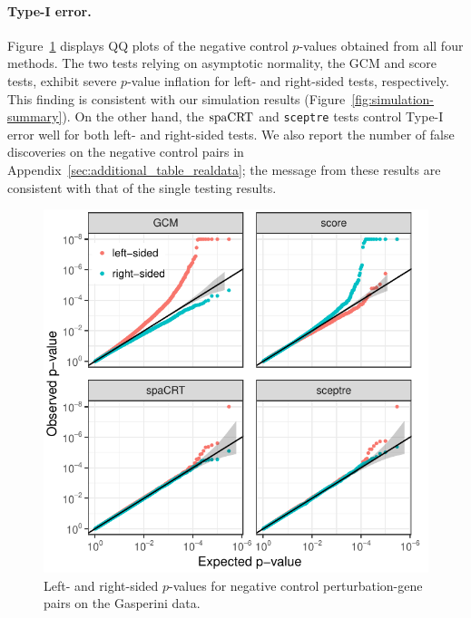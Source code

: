 \documentclass[12pt]{article}
\theoremstyle{definition}
\newcommand{\spacrt}{\textnormal{spaCRT}}               %
\begin{document}
\paragraph{Type-I error.} Figure~\ref{fig:negative-control-qq-plots} displays QQ plots of the negative control $p$-values obtained from all four methods. The two tests relying on asymptotic normality, the GCM and score tests, exhibit severe $p$-value inflation for left- and right-sided tests, respectively. This finding is consistent with our simulation results (Figure~\ref{fig:simulation-summary}). On the other hand, the $\spacrt$ and \verb|sceptre| tests control Type-I error well for both left- and right-sided tests. {\color{red} We also report the number of false discoveries on the negative control pairs in Appendix~\ref{sec:additional_table_realdata}; the message from these results are consistent with that of the single testing results.}
\begin{figure}[h!]
	\centering
	\includegraphics{figures-and-tables/condensed-without-stratification.pdf}
	\caption{Left- and right-sided $p$-values for negative control perturbation-gene pairs on the Gasperini data.}
	\label{fig:negative-control-qq-plots}
\end{figure}
\end{document}
